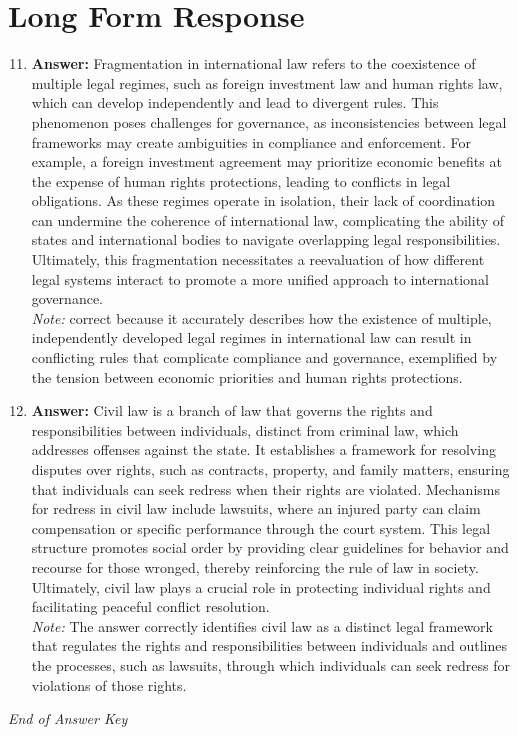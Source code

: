 \documentclass[12pt]{article}
\begin{document}
\section*{Long Form Response}
\begin{enumerate}[label=\arabic*.]
\setcounter{enumi}{10}
\item \textbf{Answer:} Fragmentation in international law refers to the coexistence of multiple legal regimes, such as foreign investment law and human rights law, which can develop independently and lead to divergent rules. This phenomenon poses challenges for governance, as inconsistencies between legal frameworks may create ambiguities in compliance and enforcement. For example, a foreign investment agreement may prioritize economic benefits at the expense of human rights protections, leading to conflicts in legal obligations. As these regimes operate in isolation, their lack of coordination can undermine the coherence of international law, complicating the ability of states and international bodies to navigate overlapping legal responsibilities. Ultimately, this fragmentation necessitates a reevaluation of how different legal systems interact to promote a more unified approach to international governance.
\\ \textit{Note:} correct because it accurately describes how the existence of multiple, independently developed legal regimes in international law can result in conflicting rules that complicate compliance and governance, exemplified by the tension between economic priorities and human rights protections.
\item \textbf{Answer:} Civil law is a branch of law that governs the rights and responsibilities between individuals, distinct from criminal law, which addresses offenses against the state. It establishes a framework for resolving disputes over rights, such as contracts, property, and family matters, ensuring that individuals can seek redress when their rights are violated. Mechanisms for redress in civil law include lawsuits, where an injured party can claim compensation or specific performance through the court system. This legal structure promotes social order by providing clear guidelines for behavior and recourse for those wronged, thereby reinforcing the rule of law in society. Ultimately, civil law plays a crucial role in protecting individual rights and facilitating peaceful conflict resolution.
\\ \textit{Note:} The answer correctly identifies civil law as a distinct legal framework that regulates the rights and responsibilities between individuals and outlines the processes, such as lawsuits, through which individuals can seek redress for violations of those rights.
\end{enumerate}

\vfill
\noindent\textit{End of Answer Key}
\end{document}
